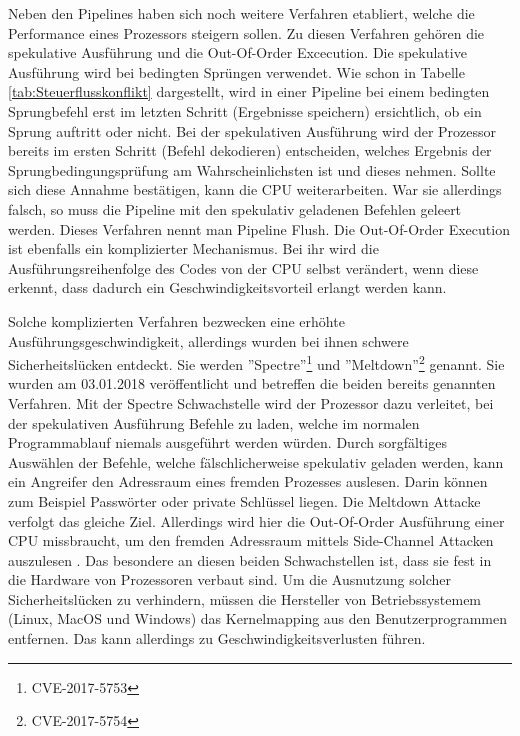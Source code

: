 \documentclass[a4paper,12pt]{article}
\begin{document}
\par\bigskip\noindent Neben den Pipelines haben sich noch weitere Verfahren etabliert, welche die Performance eines Prozessors steigern sollen. Zu diesen Verfahren gehören die spekulative Ausführung und die Out-Of-Order Excecution. Die spekulative Ausführung wird bei bedingten Sprüngen verwendet. Wie schon in Tabelle \ref{tab:Steuerflusskonflikt} dargestellt, wird in einer Pipeline bei einem bedingten Sprungbefehl erst im letzten Schritt (Ergebnisse speichern) ersichtlich, ob ein Sprung auftritt oder nicht. Bei der spekulativen Ausführung wird der Prozessor bereits im ersten Schritt (Befehl dekodieren) entscheiden, welches Ergebnis der Sprungbedingungsprüfung am Wahrscheinlichsten ist und dieses nehmen. Sollte sich diese Annahme bestätigen, kann die CPU weiterarbeiten. War sie allerdings falsch, so muss die Pipeline mit den spekulativ geladenen Befehlen geleert werden. Dieses Verfahren nennt man Pipeline Flush. \cite{mikroprozessortechnik2011} \noindent Die Out-Of-Order Execution ist ebenfalls ein komplizierter Mechanismus. Bei ihr wird die Ausführungsreihenfolge des Codes von der CPU selbst verändert, wenn diese erkennt, dass dadurch ein Geschwindigkeitsvorteil erlangt werden kann. 

\par\bigskip\noindent Solche komplizierten Verfahren bezwecken eine erhöhte Ausführungsgeschwindigkeit, allerdings wurden bei ihnen schwere Sicherheitslücken entdeckt. Sie werden ''Spectre''\footnote{CVE-2017-5753} und ''Meltdown''\footnote{CVE-2017-5754} genannt. Sie wurden am 03.01.2018 veröffentlicht und betreffen die beiden bereits genannten Verfahren. Mit der Spectre Schwachstelle wird der Prozessor dazu verleitet, bei der spekulativen Ausführung Befehle zu laden, welche im normalen Programmablauf niemals ausgeführt werden würden. Durch sorgfältiges Auswählen der Befehle, welche fälschlicherweise spekulativ geladen werden, kann ein Angreifer den Adressraum eines fremden Prozesses auslesen. Darin können zum Beispiel Passwörter oder private Schlüssel liegen\cite{spectre}. Die Meltdown Attacke verfolgt das gleiche Ziel. Allerdings wird hier die Out-Of-Order Ausführung einer CPU missbraucht, um den fremden Adressraum mittels Side-Channel Attacken auszulesen \cite{meltdown}. Das besondere an diesen beiden Schwachstellen ist, dass sie fest in die Hardware von Prozessoren verbaut sind. Um die Ausnutzung solcher Sicherheitslücken zu verhindern, müssen die Hersteller von Betriebssystemem (Linux, MacOS und Windows) das Kernelmapping aus den Benutzerprogrammen entfernen. Das kann allerdings zu Geschwindigkeitsverlusten führen.
\end{document}
